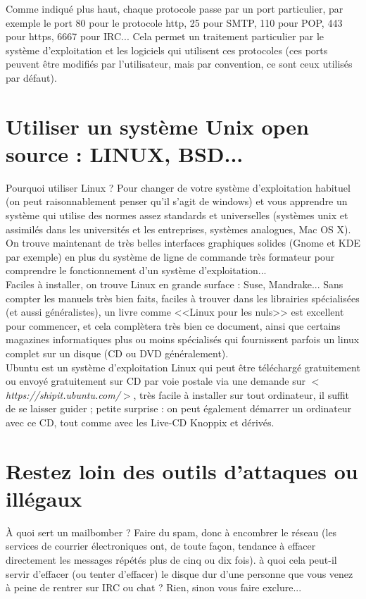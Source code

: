 \documentclass[11pt,twoside,a4paper]{article}
\begin{document}
	Comme indiqu{\'e} plus haut, chaque protocole passe par un port particulier, par exemple le port 80 pour le protocole http, 25 pour SMTP, 110 pour POP, 443 pour https, 6667 pour IRC... Cela permet un traitement particulier par le syst{\`e}me d'exploitation et les logiciels qui utilisent ces protocoles (ces ports peuvent {\^e}tre modifi{\'e}s  par l'utilisateur, mais par convention, ce sont ceux utilis{\'e}s par d{\'e}faut).~\\

\clearpage

\section{Utiliser un syst{\`e}me Unix open source : LINUX, BSD...}
		Pourquoi utiliser Linux ? Pour changer de votre syst{\`e}me d'exploitation habituel (on peut raisonnablement penser qu'il s'agit de windows) et vous apprendre un syst{\`e}me qui utilise des normes assez standards et universelles (syst{\`e}mes unix et assimil{\'e}s dans les universit{\'e}s et les entreprises, syst{\`e}mes analogues, Mac OS X). On trouve maintenant de tr{\`e}s belles interfaces graphiques solides (Gnome et KDE par exemple) en plus du syst{\`e}me de ligne de commande tr{\`e}s formateur pour comprendre le fonctionnement d'un syst{\`e}me d'exploitation...~\\

		Faciles {\`a} installer, on trouve Linux en grande surface : Suse, Mandrake... Sans compter les manuels tr{\`e}s bien faits, faciles {\`a} trouver dans les librairies sp{\'e}cialis{\'e}es (et aussi g{\'e}n{\'e}ralistes), un livre comme <<Linux pour les nuls>> est excellent pour commencer, et cela compl{\`e}tera tr{\`e}s bien ce document, ainsi que certains magazines informatiques plus ou moins sp{\'e}cialis{\'e}s qui fournissent parfois un linux complet sur un disque (CD ou DVD g{\'e}n{\'e}ralement).~\\

		Ubuntu est un syst{\`e}me d'exploitation Linux qui peut {\^e}tre t{\'e}l{\'e}charg{\'e} gratuitement ou envoy{\'e} gratuitement sur CD par voie postale via une demande sur $<$\emph{https://shipit.ubuntu.com/}$>$, tr{\`e}s facile {\`a} installer sur tout ordinateur, il suffit de se laisser guider  ; petite surprise : on peut {\'e}galement d{\'e}marrer un ordinateur avec ce CD, tout comme avec les Live-CD Knoppix et d{\'e}riv{\'e}s. ~\\

\section{Restez loin des outils d'attaques ou ill{\'e}gaux}
		{\`A} quoi sert un mailbomber ? Faire du spam, donc {\`a} encombrer le r{\'e}seau (les services de courrier {\'e}lectroniques ont, de toute fa\c{c}on, tendance {\`a} effacer directement les messages r{\'e}p{\'e}t{\'e}s plus de cinq ou dix fois). {\`a} quoi cela peut-il servir d'effacer (ou tenter d'effacer) le disque dur d'une personne que vous venez {\`a} peine de rentrer sur IRC ou chat ? Rien, sinon vous faire exclure... ~\\
\end{document}
